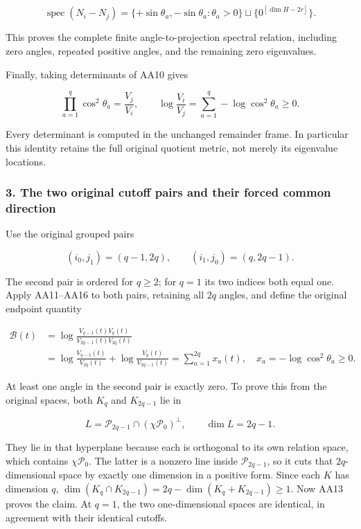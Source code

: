 \[
\operatorname{spec}(N_i-N_j)
=\{+\sin\theta_a,-\sin\theta_a:\theta_a>0\}
 \sqcup\{0^{[\dim H-2r]}\}.
\tag{AA15}
\]

This proves the complete finite angle-to-projection spectral relation, including zero angles, repeated positive angles, and the remaining zero eigenvalues.

Finally, taking determinants of AA10 gives

\[
\prod_{a=1}^q\cos^2\theta_a
=\frac{V_j}{V_i},\qquad
\log\frac{V_i}{V_j}
=\sum_{a=1}^q -\log\cos^2\theta_a\ge0.
\tag{AA16}
\]

Every determinant is computed in the unchanged remainder frame. In particular this identity retains the full original quotient metric, not merely its eigenvalue locations.

\subsubsection{3. The two original cutoff pairs and their forced common direction}\label{endpoint-all_degree_angle_review--the-two-original-cutoff-pairs-and-their-forced-common-direction}

Use the original grouped pairs

\[
(i_0,j_1)=(q-1,2q),\qquad
(i_1,j_0)=(q,2q-1).
\tag{AA17}
\]

The second pair is ordered for \(q\ge2\); for \(q=1\) its two indices both equal one. Apply AA11--AA16 to both pairs, retaining all \(2q\) angles, and define the original endpoint quantity

\[
\begin{aligned}
\mathcal B(t)
&=\log\frac{V_{q-1}(t)V_q(t)}{V_{2q-1}(t)V_{2q}(t)}\\
&=\log\frac{V_{q-1}(t)}{V_{2q}(t)}
 +\log\frac{V_q(t)}{V_{2q-1}(t)}
=\sum_{a=1}^{2q}x_a(t),\quad
x_a=-\log\cos^2\theta_a\ge0.
\end{aligned}
\tag{AA18}
\]

At least one angle in the second pair is exactly zero. To prove this from the original spaces, both \(K_q\) and \(K_{2q-1}\) lie in

\[
L=\mathcal P_{2q-1}\cap(\chi\mathcal P_0)^\perp,
\qquad\dim L=2q-1.
\tag{AA19}
\]

They lie in that hyperplane because each is orthogonal to its own relation space, which contains \(\chi\mathcal P_0\). The latter is a nonzero line inside \(\mathcal P_{2q-1}\), so it cuts that \(2q\)-dimensional space by exactly one dimension in a positive form. Since each \(K\) has dimension \(q\), \(\dim(K_q\cap K_{2q-1})=2q-\dim(K_q+K_{2q-1})\ge1\). Now AA13 proves the claim. At \(q=1\), the two one-dimensional spaces are identical, in agreement with their identical cutoffs.

